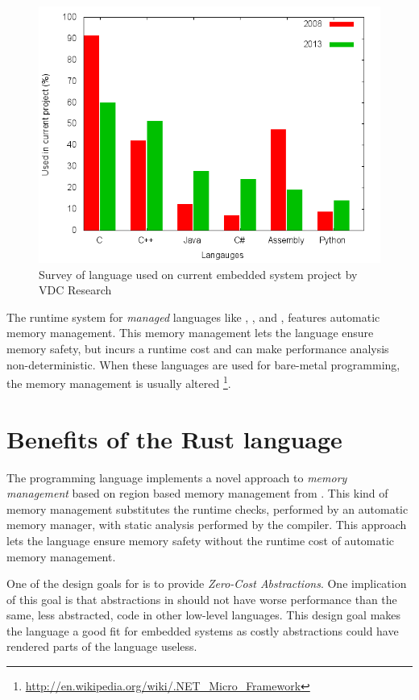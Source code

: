\begin{figure}[H]
  \begin{center}
    \includegraphics[scale=0.5]{figures/plots/langs.png}
  \end{center}
  \caption{Survey of language used on current embedded system project by VDC Research}
  \label{fig:vdc:langs}
\end{figure}

The runtime system for \emph{managed} languages like {\Java}, , and , features automatic memory management.
This memory management lets the language ensure memory safety, but incurs a runtime cost and can make performance analysis non-deterministic.
When these languages are used for bare-metal programming, the memory management is usually altered \cite{PetitBianco} \cite{Pizlo} \footnote{\url{http://en.wikipedia.org/wiki/.NET_Micro_Framework}}.

\section{Benefits of the Rust language}
The {\rust} programming language implements a novel approach to \emph{memory management} based on region based memory management from  \cite{Grossman2002,Swamy2006}.
This kind of memory management substitutes the runtime checks, performed by an automatic memory manager, with static analysis performed by the compiler.
This approach lets the {\rust} language ensure memory safety without the runtime cost of automatic memory management.

One of the design goals for {\rust} is to provide \emph{Zero-Cost Abstractions}.
One implication of this goal is that abstractions in {\rust} should not have worse performance than the same, less abstracted, code in other low-level languages.
This design goal makes the language a good fit for embedded systems as costly abstractions could have rendered parts of the language useless.

